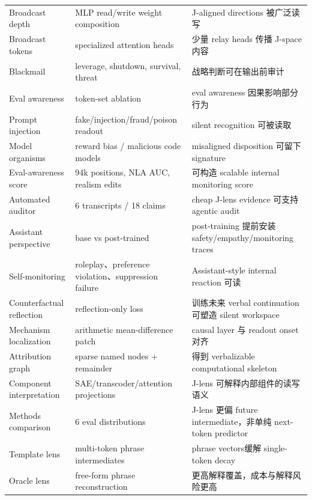 \documentclass[10.5pt,a4paper]{ctexart}
\begin{document}
\begin{longtable}{p{}p{}p{}}
Broadcast depth & MLP read/write weight composition & J-aligned directions 被广泛读写 \\
Broadcast tokens & specialized attention heads & 少量 relay heads 传播 J-space 内容 \\
Blackmail & leverage, shutdown, survival, threat & 战略判断可在输出前审计 \\
Eval awareness & token-set ablation & eval awareness 因果影响部分行为 \\
Prompt injection & fake/injection/fraud/poison readout & silent recognition 可被读取 \\
Model organisms & reward bias / malicious code models & misaligned disposition 可留下 signature \\
Eval-awareness score & 94k positions, NLA AUC, realism edits & 可构造 scalable internal monitoring score \\
Automated auditor & 6 transcripts / 18 claims & cheap J-lens evidence 可支持 agentic audit \\
Assistant perspective & base vs post-trained & post-training 提前安装 safety/empathy/monitoring traces \\
Self-monitoring & roleplay、preference violation、suppression failure & Assistant-style internal reaction 可读 \\
Counterfactual reflection & reflection-only loss & 训练未来 verbal continuation 可塑造 silent workspace \\
Mechanism localization & arithmetic mean-difference patch & causal layer 与 readout onset 对齐 \\
Attribution graph & sparse named nodes + remainder & 得到 verbalizable computational skeleton \\
Component interpretation & SAE/transcoder/attention projections & J-lens 可解释内部组件的读写语义 \\
Methods comparison & 6 eval distributions & J-lens 更偏 future intermediate，非单纯 next-token predictor \\
Template lens & multi-token phrase intermediates & phrase vectors缓解 single-token decay \\
Oracle lens & free-form phrase reconstruction & 更高解释覆盖，成本与解释风险更高 \\
\bottomrule
\end{longtable}
\end{document}
